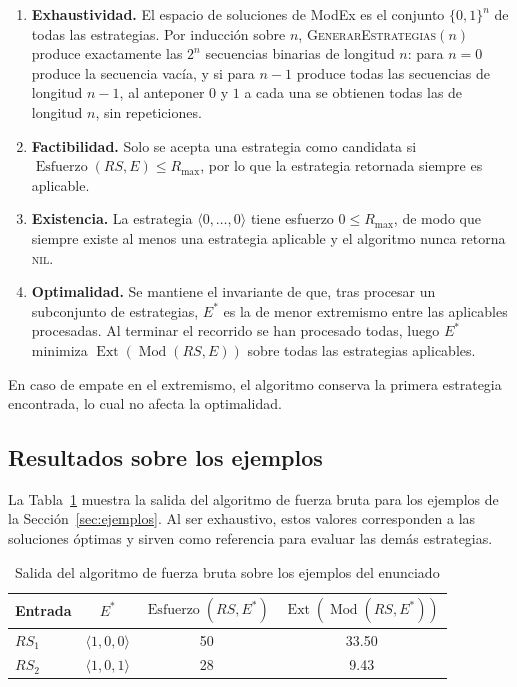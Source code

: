 \documentclass[11pt,letterpaper]{article}
\newcommand{\RS}{\mathit{RS}}
\newcommand{\Rmax}{R_{\max}}
\newcommand{\Ext}{\operatorname{Ext}}
\newcommand{\Esf}{\operatorname{Esfuerzo}}
\newcommand{\Mod}{\operatorname{Mod}}
\begin{document}
\begin{enumerate}
  \item \textbf{Exhaustividad.} El espacio de soluciones de ModEx es el
        conjunto $\{0,1\}^n$ de todas las estrategias. Por inducción sobre $n$,
        \textsc{GenerarEstrategias}$(n)$ produce exactamente las $2^n$
        secuencias binarias de longitud $n$: para $n=0$ produce la secuencia
        vacía, y si para $n-1$ produce todas las secuencias de longitud $n-1$,
        al anteponer $0$ y $1$ a cada una se obtienen todas las de longitud $n$,
        sin repeticiones.
  \item \textbf{Factibilidad.} Solo se acepta una estrategia como candidata si
        $\Esf(\RS,E) \le \Rmax$, por lo que la estrategia retornada siempre es
        aplicable.
  \item \textbf{Existencia.} La estrategia $\langle 0,\dots,0 \rangle$ tiene
        esfuerzo $0 \le \Rmax$, de modo que siempre existe al menos una
        estrategia aplicable y el algoritmo nunca retorna \textsc{nil}.
  \item \textbf{Optimalidad.} Se mantiene el invariante de que, tras procesar
        un subconjunto de estrategias, $E^*$ es la de menor extremismo entre las
        aplicables procesadas. Al terminar el recorrido se han procesado todas,
        luego $E^*$ minimiza $\Ext(\Mod(\RS,E))$ sobre todas las estrategias
        aplicables.
\end{enumerate}

En caso de empate en el extremismo, el algoritmo conserva la primera
estrategia encontrada, lo cual no afecta la optimalidad.

\subsection{Resultados sobre los ejemplos}

La Tabla~\ref{tab:fb-ejemplos} muestra la salida del algoritmo de fuerza bruta
para los ejemplos de la Sección~\ref{sec:ejemplos}. Al ser exhaustivo, estos
valores corresponden a las soluciones óptimas y sirven como referencia para
evaluar las demás estrategias.

\begin{table}[H]
  \centering
  \caption{Salida del algoritmo de fuerza bruta sobre los ejemplos del enunciado}
  \label{tab:fb-ejemplos}
  \begin{tabular}{lccc}
    \toprule
    Entrada & $E^*$ & $\Esf(\RS,E^*)$ & $\Ext(\Mod(\RS,E^*))$ \\
    \midrule
    $\RS_1$ & $\langle 1,0,0 \rangle$ & 50 & 33.50 \\
    $\RS_2$ & $\langle 1,0,1 \rangle$ & 28 & 9.43 \\
    \bottomrule
  \end{tabular}
\end{table}
\end{document}
